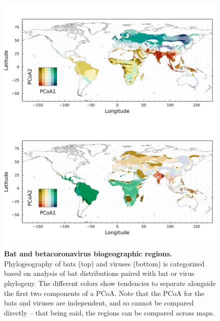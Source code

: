\documentclass[11pt]{article}
\makeatletter
\def\maxwidth{\ifdim\Gin@nat@width>\linewidth\linewidth
\else\Gin@nat@width\fi}
\let\Oldincludegraphics\includegraphics
\renewcommand{\includegraphics}[1]{\Oldincludegraphics[width=\maxwidth]{#1}}
\makeatother
\begin{document}
\begin{figure}
\hypertarget{fig:biogeo}{%
\centering
\includegraphics{figures/combined_biogeo.png}
\caption{\textbf{Bat and betacoronavirus biogeographic regions.}
Phylogeography of bats (top) and viruses (bottom) is categorized based
on analysis of bat distributions paired with bat or virus phylogeny. The
different colors show tendencies to separate alongside the first two
components of a PCoA. Note that the PCoA for the bats and viruses are
independent, and so cannot be compared directly -- that being said, the
regions can be compared across maps.}\label{fig:biogeo}
}
\end{figure}
\end{document}
